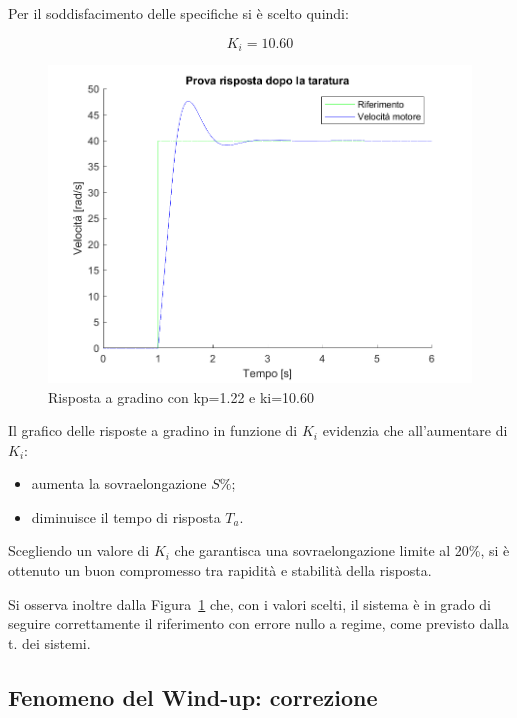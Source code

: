 \documentclass[a4paper,12pt]{article}
\begin{document}
Per il soddisfacimento delle specifiche si è scelto quindi:

\[
    K_i = 10.60
\]

\begin{figure}[h!]
    \centering
    \includegraphics[scale=0.6]{Immagini/PlotMatlab/rispostaGradinoDopoTaratura.png}
    \caption{Risposta a gradino con kp=1.22 e ki=10.60}
    \label{fig:kiscelto}
\end{figure}

\vspace{0.5cm}

Il grafico delle risposte a gradino in funzione di $K_i$ evidenzia che all’aumentare di $K_i$:
\begin{itemize}
    \item aumenta la sovraelongazione $S\%$;
    \item diminuisce il tempo di risposta $T_a$.
\end{itemize}

Scegliendo un valore di $K_i$ che garantisca una sovraelongazione limite al 20\%, si è ottenuto un buon compromesso tra rapidità e stabilità della risposta.


\vspace{0.5cm}
Si osserva inoltre dalla Figura~\ref{fig:kiscelto} che, con i valori scelti, il sistema è in grado di seguire correttamente il riferimento con errore nullo a regime, come previsto dalla t. dei sistemi.


\subsection{Fenomeno del Wind-up: correzione}
\end{document}
